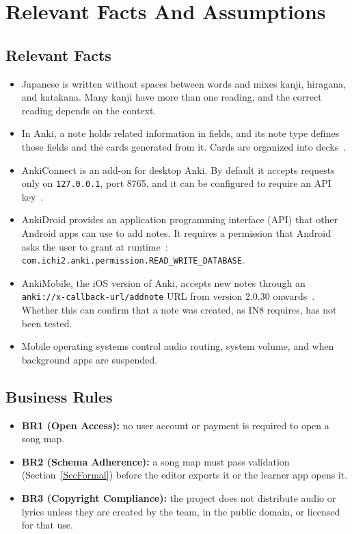 \documentclass[12pt]{article}
\begin{document}
\section{Relevant Facts And Assumptions}
\subsection{Relevant Facts} \label{SecFacts}
\begin{itemize}
    \item Japanese is written without spaces between words and mixes kanji,
          hiragana, and katakana. Many kanji have more than one reading, and
          the correct reading depends on the context.
    \item In Anki, a note holds related information in fields, and its note
          type defines those fields and the cards generated from it. Cards
          are organized into decks~\cite{AnkiManual}.
    \item AnkiConnect is an add-on for desktop Anki. By default it accepts
          requests only on \texttt{127.0.0.1}, port 8765, and it can be
          configured to require an API key~\cite{AnkiConnect}.
    \item AnkiDroid provides an application programming interface (API) that other Android apps can use to add
          notes. It requires a permission that Android asks the user to
          grant at runtime~\cite{AnkiDroidAPI}:\\
          \nolinkurl{com.ichi2.anki.permission.READ_WRITE_DATABASE}.
    \item AnkiMobile, the iOS version of Anki, accepts new notes through an
          \nolinkurl{anki://x-callback-url/addnote} URL from version 2.0.30
          onwards~\cite{AnkiMobileURL}. Whether this can confirm that a note
          was created, as IN8 requires, has not been tested.
    \item Mobile operating systems control audio routing, system volume, and
          when background apps are suspended.
\end{itemize}

\subsection{Business Rules} \label{SecRules}
\begin{itemize}
    \item \textbf{BR1 (Open Access):} no user account or payment is required to
          open a song map.
    \item \textbf{BR2 (Schema Adherence):} a song map must pass validation
          (Section~\ref{SecFormal}) before the editor exports it or the learner
          app opens it.
    \item \textbf{BR3 (Copyright Compliance):} the project does not distribute
          audio or lyrics unless they are created by the team, in the public domain,
          or licensed for that use.
\end{itemize}
\end{document}
